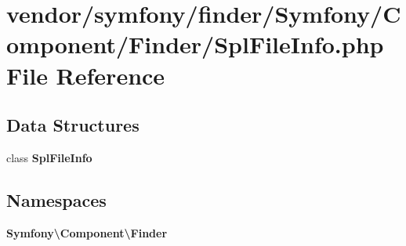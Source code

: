 \section{vendor/symfony/finder/\+Symfony/\+Component/\+Finder/\+Spl\+File\+Info.php File Reference}
\label{_spl_file_info_8php}
\subsection*{Data Structures}
\begin{DoxyCompactItemize}
\item 
class {\bf Spl\+File\+Info}
\end{DoxyCompactItemize}
\subsection*{Namespaces}
\begin{DoxyCompactItemize}
\item 
 {\bf Symfony\textbackslash{}\+Component\textbackslash{}\+Finder}
\end{DoxyCompactItemize}

